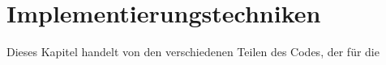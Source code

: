 
\chapter{Implementierungstechniken}\label{chp:implementierungstechniken}
Dieses Kapitel handelt von den verschiedenen Teilen des Codes, der für die 